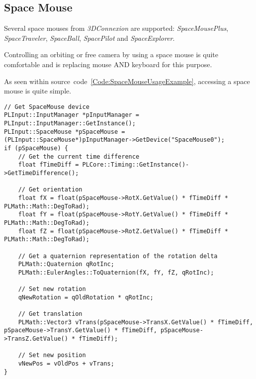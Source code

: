 \subsection{Space Mouse}
Several space mouses from \emph{3DConnexion} are supported: \emph{SpaceMousePlus}, \emph{SpaceTraveler}, \emph{SpaceBall}, \emph{SpacePilot} and \emph{SpaceExplorer}.

Controlling an orbiting or free camera by using a space mouse is quite comfortable and is replacing mouse AND keyboard for this purpose.

As seen within source~code~\ref{Code:SpaceMouseUsageExample}, accessing a space mouse is quite simple.
\begin{lstlisting}[float=htb,label=Code:SpaceMouseUsageExample,caption={Space mouse usage example}]
// Get SpaceMouse device
PLInput::InputManager *pInputManager = PLInput::InputManager::GetInstance();
PLInput::SpaceMouse *pSpaceMouse = (PLInput::SpaceMouse*)pInputManager->GetDevice("SpaceMouse0");
if (pSpaceMouse) {
	// Get the current time difference
	float fTimeDiff = PLCore::Timing::GetInstance()->GetTimeDifference();

	// Get orientation
	float fX = float(pSpaceMouse->RotX.GetValue() * fTimeDiff * PLMath::Math::DegToRad);
	float fY = float(pSpaceMouse->RotY.GetValue() * fTimeDiff * PLMath::Math::DegToRad);
	float fZ = float(pSpaceMouse->RotZ.GetValue() * fTimeDiff * PLMath::Math::DegToRad);

	// Get a quaternion representation of the rotation delta
	PLMath::Quaternion qRotInc;
	PLMath::EulerAngles::ToQuaternion(fX, fY, fZ, qRotInc);

	// Set new rotation
	qNewRotation = qOldRotation * qRotInc;

	// Get translation
	PLMath::Vector3 vTrans(pSpaceMouse->TransX.GetValue() * fTimeDiff, pSpaceMouse->TransY.GetValue() * fTimeDiff, pSpaceMouse->TransZ.GetValue() * fTimeDiff);

	// Set new position
	vNewPos = vOldPos + vTrans;
}
\end{lstlisting}
